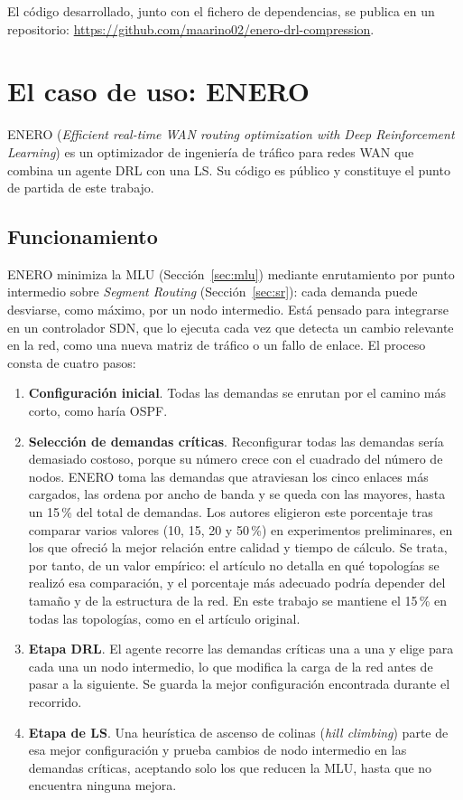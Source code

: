 El código desarrollado, junto con el fichero de dependencias, se publica en un repositorio: \url{https://github.com/maarino02/enero-drl-compression}.

\section{El caso de uso: ENERO}\label{sec:enero}

ENERO (\textit{Efficient real-time WAN routing optimization with Deep Reinforcement Learning}) \cite{ALMASAN2022109166} es un optimizador de ingeniería de tráfico para redes WAN que combina un agente DRL con una LS. Su código es público y constituye el punto de partida de este trabajo.

\subsection{Funcionamiento}

ENERO minimiza la MLU (Sección~\ref{sec:mlu}) mediante enrutamiento por punto intermedio sobre \textit{Segment Routing} (Sección~\ref{sec:sr}): cada demanda puede desviarse, como máximo, por un nodo intermedio. Está pensado para integrarse en un controlador SDN, que lo ejecuta cada vez que detecta un cambio relevante en la red, como una nueva matriz de tráfico o un fallo de enlace. El proceso consta de cuatro pasos:

\begin{enumerate}
	\item \textbf{Configuración inicial}. Todas las demandas se enrutan por el camino más corto, como haría OSPF.
	\item \textbf{Selección de demandas críticas}. Reconfigurar todas las demandas sería demasiado costoso, porque su número crece con el cuadrado del número de nodos. ENERO toma las demandas que atraviesan los cinco enlaces más cargados, las ordena por ancho de banda y se queda con las mayores, hasta un 15\,\% del total de demandas. Los autores eligieron este porcentaje tras comparar varios valores (10, 15, 20 y 50\,\%) en experimentos preliminares, en los que ofreció la mejor relación entre calidad y tiempo de cálculo. Se trata, por tanto, de un valor empírico: el artículo no detalla en qué topologías se realizó esa comparación, y el porcentaje más adecuado podría depender del tamaño y de la estructura de la red. En este trabajo se mantiene el 15\,\% en todas las topologías, como en el artículo original.
	\item \textbf{Etapa DRL}. El agente recorre las demandas críticas una a una y elige para cada una un nodo intermedio, lo que modifica la carga de la red antes de pasar a la siguiente. Se guarda la mejor configuración encontrada durante el recorrido.
	\item \textbf{Etapa de LS}. Una heurística de ascenso de colinas (\textit{hill climbing}) parte de esa mejor configuración y prueba cambios de nodo intermedio en las demandas críticas, aceptando solo los que reducen la MLU, hasta que no encuentra ninguna mejora.
\end{enumerate}

